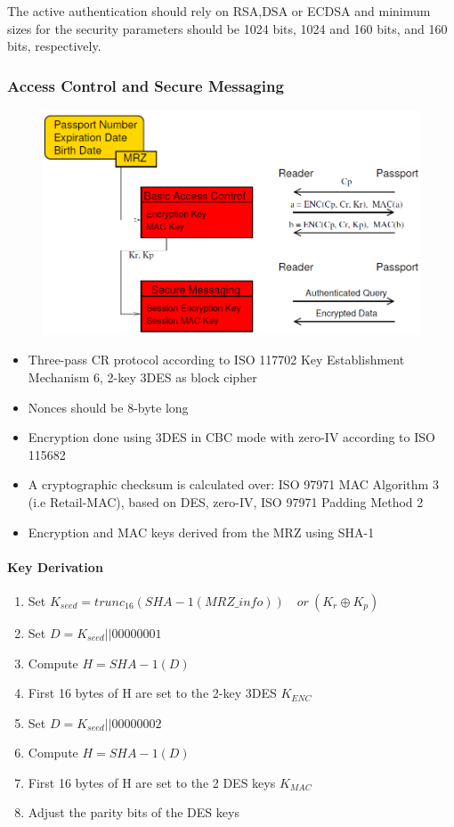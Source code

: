 The active authentication should rely on RSA,DSA or ECDSA and minimum sizes for
the security parameters should be 1024 bits, 1024 and 160 bits, and 160 bits,
respectively.

\subsubsection{Access Control and Secure Messaging}
\begin{figure}[ht!]
    \centering
    \includegraphics[scale=0.5]{img/access-control}
\end{figure}
\begin{itemize}
    \item Three-pass CR protocol according to ISO 11770\text{-}2 Key Establishment
    Mechanism 6, 2-key 3DES as block cipher
    \item Nonces should be 8-byte long
    \item Encryption done using 3DES in CBC mode with zero-IV according to
    ISO 11568\text{-}2
    \item A cryptographic checksum is calculated over: ISO 9797\text{-}1 MAC
    Algorithm 3 (i.e Retail-MAC), based on DES, zero-IV, ISO 9797\text{-}1 Padding
    Method 2
    \item Encryption and MAC keys derived from the MRZ using SHA-1
\end{itemize}

\paragraph{Key Derivation}
\begin{enumerate}
    \item Set $ K_{seed} = trunc_{16}(SHA-1(MRZ\_info))\quad or\ (K_r \oplus K_p)$
    \item Set $ D = K_{seed}||00000001 $
    \item Compute $ H = SHA-1(D) $
    \item First 16 bytes of H are set to the 2-key 3DES $ K_{ENC} $
    \item Set $ D = K_{seed}||00000002 $
    \item Compute $ H = SHA-1(D) $
    \item First 16 bytes of H are set to the 2 DES keys $K_{MAC} $
    \item Adjust the parity bits of the DES keys
\end{enumerate}

